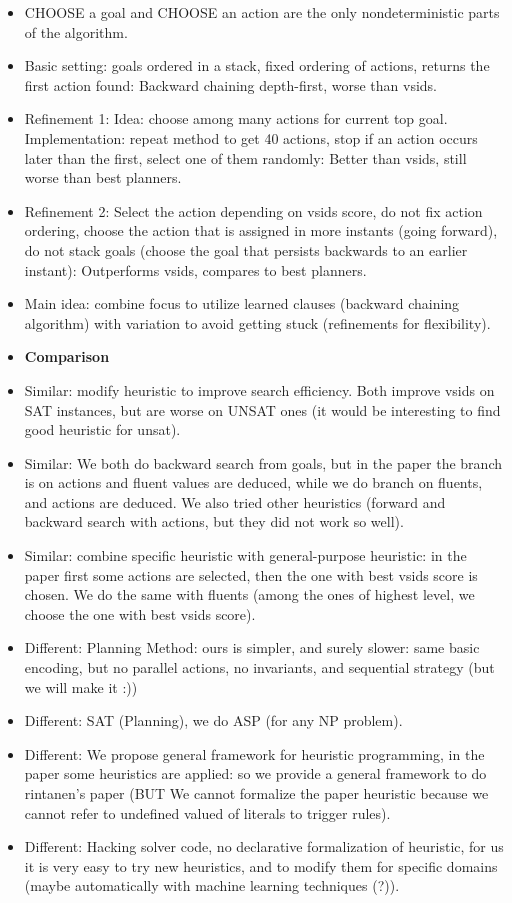 \begin{itemize}
	(else) if g is false at t' ($t'<t$) and would persist until t, 
					CHOOSE an action a at t' that causes g to true at t'+1.
	\item CHOOSE a goal and CHOOSE an action are the only nondeterministic parts of the algorithm.
	\item Basic setting: goals ordered in a stack, fixed ordering of actions, returns the first action found: Backward chaining depth-first, worse than vsids.
	\item Refinement 1: Idea: choose among many actions for current top goal. Implementation: repeat method to get 40 actions, stop if an action occurs later than the first, select one of them randomly: Better than vsids, still worse than best planners.
	\item Refinement 2: Select the action depending on vsids score, do not fix action ordering, choose the action that is assigned in more instants (going forward), do not stack goals (choose the goal that persists backwards to an earlier instant): Outperforms vsids, compares to best planners.
	\item Main idea: combine focus to utilize learned clauses (backward chaining algorithm) with variation to avoid getting stuck (refinements for flexibility).
	\item \textbf{Comparison}
	\item Similar: modify heuristic to improve search efficiency. Both improve vsids on SAT instances, but are worse on UNSAT ones (it would be interesting to find good heuristic for unsat).
	\item Similar: We both do backward search from goals, but in the paper the branch is on actions and fluent values are deduced, while we do branch on fluents, and actions are deduced. We also tried other heuristics (forward and backward search with actions, but they did not work so well).
	\item Similar: combine specific heuristic with general-purpose heuristic: in the paper first some actions are selected, then the one with best vsids score is chosen. We do the same with fluents (among the ones of highest level, we choose the one with best vsids score).
  \item Different: Planning Method: ours is simpler, and surely slower: same basic encoding, but no parallel actions, no invariants, and sequential strategy (but we will make it :))	
  \item Different: SAT (Planning), we do ASP (for any NP problem).
	\item Different: We propose general framework for heuristic programming, in the paper some heuristics are applied: so we provide a general framework to do rintanen's paper (BUT We cannot formalize the paper heuristic because we cannot refer to undefined valued of literals to trigger rules).
	\item Different: Hacking solver code, no declarative formalization of heuristic, for us it is very easy to try new heuristics, and to modify them for specific domains (maybe automatically with machine learning techniques (?)).
\end{itemize}

